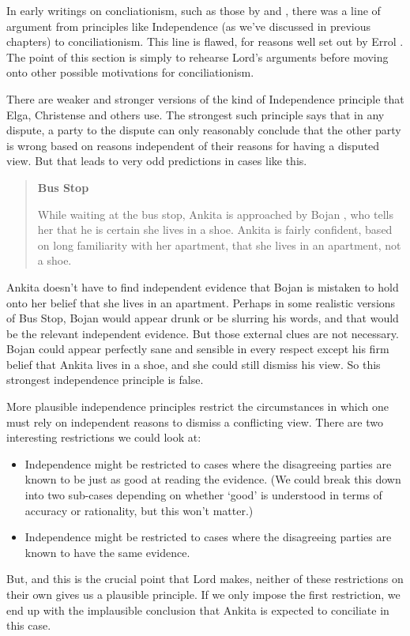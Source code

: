 In early writings on concliationism, such as those by \citet{Elga2007} and \citet{Christensen2009}, there was a line of argument from principles like Independence (as we've discussed in previous chapters) to conciliationism. This line is flawed, for reasons well set out by Errol \citet{Lord2014}. The point of this section is simply to rehearse Lord's arguments before moving onto other possible motivations for conciliationism.

There are weaker and stronger versions of the kind of Independence principle that Elga, Christense and others use. The strongest such principle says that in any dispute, a party to the dispute can only reasonably conclude that the other party is wrong based on reasons independent of their reasons for having a disputed view. But that leads to very odd predictions in cases like this.

\begin{quote}
\textbf{Bus Stop}

While waiting at the bus stop, \gls{Ankita} is approached by \gls{Bojan} , who tells her that he is certain she lives in a shoe. \gls{Ankita} is fairly confident, based on long familiarity with her apartment, that she lives in an apartment, not a shoe.
\end{quote}
\gls{Ankita} doesn't have to find independent evidence that \gls{Bojan} is mistaken to hold onto her belief that she lives in an apartment. Perhaps in some realistic versions of Bus Stop, \gls{Bojan} would appear drunk or be slurring his words, and that would be the relevant independent evidence. But those external clues are not necessary. \gls{Bojan} could appear perfectly sane and sensible in every respect except his firm belief that \gls{Ankita} lives in a shoe, and she could still dismiss his view. So this strongest independence principle is false.

More plausible independence principles restrict the circumstances in which one must rely on independent reasons to dismiss a conflicting view. There are two interesting restrictions we could look at:

\begin{itemize}
\item{} Independence might be restricted to cases where the disagreeing parties are known to be just as good at reading the evidence. (We could break this down into two sub-cases depending on whether `good' is understood in terms of accuracy or rationality, but this won't matter.)

\item{} Independence might be restricted to cases where the disagreeing parties are known to have the same evidence.

\end{itemize}
But, and this is the crucial point that Lord makes, neither of these restrictions on their own gives us a plausible principle. If we only impose the first restriction, we end up with the implausible conclusion that \gls{Ankita} is expected to conciliate in this case.

